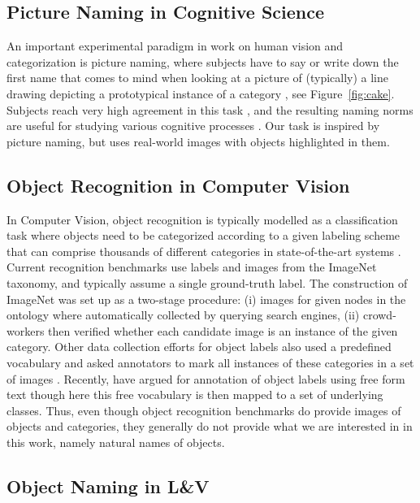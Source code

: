\subsection{Picture Naming in Cognitive Science}

An important experimental paradigm in work on human vision and categorization is picture naming, where subjects have to say or write down the first name that comes to mind when looking at a picture of (typically) a line drawing depicting a prototypical instance of a category \cite{snodgrass,rossion2004revisiting}, see Figure\ \ref{fig:cake}.
Subjects reach very high agreement in this task \cite{rossion2004revisiting}, and the resulting naming norms are useful for studying various cognitive processes \cite{humphreys1988cascade}.
Our task is inspired by picture naming, but uses real-world images with objects highlighted in them.

\subsection{Object Recognition in Computer Vision}

In Computer Vision, object recognition is typically modelled as a classification task where objects need to be categorized according to a given labeling scheme that can comprise thousands of different categories in state-of-the-art systems \cite{googlenet,ILSVRC15}. 
Current recognition benchmarks use labels and images from the ImageNet \cite{imagenet_cvpr09} taxonomy, and typically assume a single ground-truth label. 
The construction of ImageNet was set up as a two-stage procedure: (i) images for given nodes in the ontology where automatically collected by querying search engines, (ii) crowd-workers then verified whether each candidate image is an instance of the given category.
Other data collection efforts for object labels also used a predefined vocabulary and asked annotators to mark all instances of these categories in a set of images \cite{mscoco,OpenImages}. 
Recently,  have argued for annotation of object labels using free form text though here this free vocabulary is then mapped to a set of underlying classes.
Thus, even though object recognition benchmarks do provide images of objects and categories, they generally do not provide what we are interested in in this work, namely natural names of objects.



\subsection{Object Naming in L\&V} 

